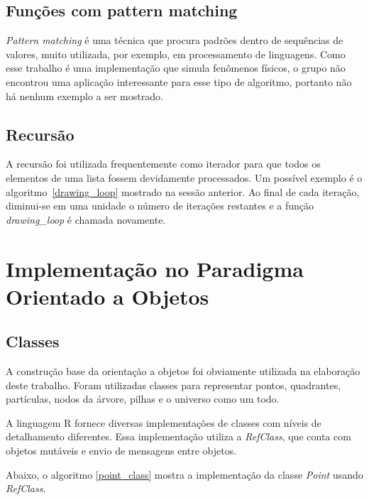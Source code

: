 \documentclass[rel_mlp]{iiufrgs}
\begin{document}
    \subsection{Funções com pattern matching}

    \textit{Pattern matching} é uma técnica que procura padrões dentro de sequências de valores, muito utilizada, por exemplo, em processamento de linguagens. Como esse trabalho é uma implementação que simula fenômenos físicos, o grupo não encontrou uma aplicação interessante para esse tipo de algoritmo, portanto não há nenhum exemplo a ser mostrado.

    \subsection{Recursão}

      A recursão foi utilizada frequentemente como iterador para que todos os elementos de uma lista
      fossem devidamente processados. Um possível exemplo é o algoritmo~\ref{drawing_loop}
      mostrado na sessão anterior. Ao final de cada iteração, diminui-se em uma unidade o número de iterações
      restantes e a função \textit{drawing{\_}loop} é chamada novamente.


\section{Implementação no Paradigma Orientado a Objetos}

\subsection{Classes}

    A construção base da orientação a objetos foi obviamente utilizada na elaboração deste trabalho.
    Foram utilizadas classes para representar pontos, quadrantes, partículas, nodos da árvore, pilhas e
    o universo como um todo.

    A linguagem R fornece diversas implementações de classes \cite{RClasses} com níveis de detalhamento diferentes.
    Essa implementação utiliza a \textit{RefClass}, que conta com objetos mutáveis e envio de mensagens
    entre objetos.

    Abaixo, o algoritmo \ref{point_class} mostra a implementação da classe \textit{Point} usando \textit{RefClass}.
\end{document}
